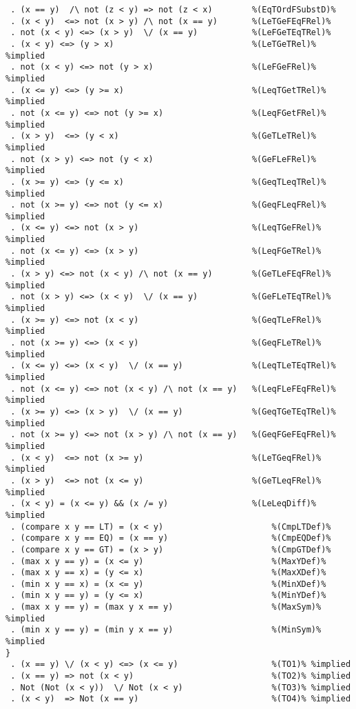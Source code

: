 \begin{Verbatim}
 . (x == y)  /\ not (z < y) => not (z < x)        %(EqTOrdFSubstD)%
 . (x < y)  <=> not (x > y) /\ not (x == y)       %(LeTGeFEqFRel)%
 . not (x < y) <=> (x > y)  \/ (x == y)           %(LeFGeTEqTRel)%
 . (x < y) <=> (y > x)                            %(LeTGeTRel)% %implied
 . not (x < y) <=> not (y > x)                    %(LeFGeFRel)% %implied
 . (x <= y) <=> (y >= x)                          %(LeqTGetTRel)% %implied
 . not (x <= y) <=> not (y >= x)                  %(LeqFGetFRel)% %implied
 . (x > y)  <=> (y < x)                           %(GeTLeTRel)% %implied
 . not (x > y) <=> not (y < x)                    %(GeFLeFRel)% %implied
 . (x >= y) <=> (y <= x)                          %(GeqTLeqTRel)% %implied
 . not (x >= y) <=> not (y <= x)                  %(GeqFLeqFRel)% %implied
 . (x <= y) <=> not (x > y)                       %(LeqTGeFRel)% %implied
 . not (x <= y) <=> (x > y)                       %(LeqFGeTRel)% %implied
 . (x > y) <=> not (x < y) /\ not (x == y)        %(GeTLeFEqFRel)% %implied
 . not (x > y) <=> (x < y)  \/ (x == y)           %(GeFLeTEqTRel)% %implied
 . (x >= y) <=> not (x < y)                       %(GeqTLeFRel)% %implied
 . not (x >= y) <=> (x < y)                       %(GeqFLeTRel)% %implied
 . (x <= y) <=> (x < y)  \/ (x == y)              %(LeqTLeTEqTRel)% %implied
 . not (x <= y) <=> not (x < y) /\ not (x == y)   %(LeqFLeFEqFRel)% %implied
 . (x >= y) <=> (x > y)  \/ (x == y)              %(GeqTGeTEqTRel)% %implied
 . not (x >= y) <=> not (x > y) /\ not (x == y)   %(GeqFGeFEqFRel)% %implied
 . (x < y)  <=> not (x >= y)                      %(LeTGeqFRel)% %implied
 . (x > y)  <=> not (x <= y)                      %(GeTLeqFRel)% %implied
 . (x < y) = (x <= y) && (x /= y)                 %(LeLeqDiff)% %implied
 . (compare x y == LT) = (x < y)                      %(CmpLTDef)%
 . (compare x y == EQ) = (x == y)                     %(CmpEQDef)%
 . (compare x y == GT) = (x > y)                      %(CmpGTDef)%
 . (max x y == y) = (x <= y)                          %(MaxYDef)%
 . (max x y == x) = (y <= x)                          %(MaxXDef)%
 . (min x y == x) = (x <= y)                          %(MinXDef)%
 . (min x y == y) = (y <= x)                          %(MinYDef)%
 . (max x y == y) = (max y x == y)                    %(MaxSym)% %implied
 . (min x y == y) = (min y x == y)                    %(MinSym)% %implied
}
 . (x == y) \/ (x < y) <=> (x <= y)                   %(TO1)% %implied
 . (x == y) => not (x < y)                            %(TO2)% %implied
 . Not (Not (x < y))  \/ Not (x < y)                  %(TO3)% %implied
 . (x < y)  => Not (x == y)                           %(TO4)% %implied

\end{Verbatim}
